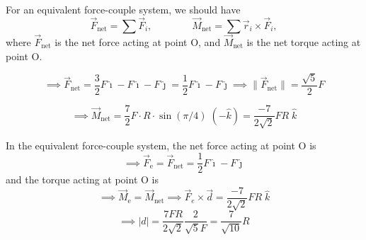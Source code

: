 \newpage
For an equivalent force-couple system, we should have
\begin{equation*}
    \vec{F}_{\text{net}}
    =
    \sum \vec{F}_i,
    \qquad\qquad
    \vec{M}_{\text{net}}
    =
    \sum \vec{r}_i \times \vec{F}_i,
\end{equation*}
where \(\vec{F}_{\text{net}}\) is the net force acting at point O, and \(\vec{M}_{\text{net}}\) is the net torque acting at point O.

\begin{equation*}
    \implies
    \vec{F}_{\text{net}}
    =
    \frac{3}{2} F \hat\imath - F \hat\imath - F \hat\jmath
    =
    \frac{1}{2} F \hat\imath - F \hat\jmath
    \implies
    \lVert \vec{F}_{\text{net}} \rVert
    =
    \frac{\sqrt{5}}{2} F
\end{equation*}

\begin{equation*}
    \implies
    \vec{M}_{\text{net}}
    =
    \frac{7}{2} F \cdot R \cdot \sin(\pi / 4) \; (-\hat k)
    =
    \frac{-7}{2\sqrt{2}} F R \; \hat k
\end{equation*}

In the equivalent force-couple system, the net force acting at point O is
\[
    \implies
    \vec{F}_{\text{e}} = \vec{F}_{\text{net}} = \boxed{\frac{1}{2} F \hat\imath - F \hat\jmath}
\]
and the torque acting at point O is
\[
    \implies
    \vec{M}_{\text{e}} = \vec{M}_{\text{net}}
    \implies
    \vec{F}_{e} \times \vec{d} = \frac{-7}{2\sqrt{2}} F R \; \hat k
\]
\[
    \implies
    |d| = \frac{7FR}{2\sqrt{2}} \frac{2}{\sqrt{5}F} = \boxed{\frac{7}{\sqrt{10}} R}
\]
